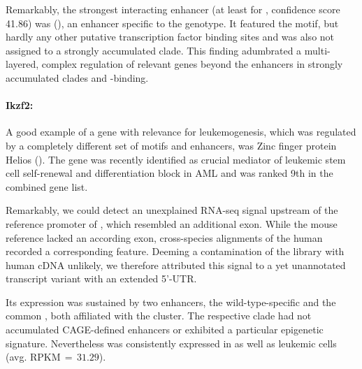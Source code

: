 Remarkably, the strongest interacting enhancer (at least for , confidence score \num{41.86}) was (), an enhancer specific to the  \dnmtchip genotype. It featured the \motifmlltwo motif, but hardly any other putative transcription factor binding sites and was also not assigned to a strongly accumulated clade. This finding adumbrated a multi-layered, complex regulation of relevant genes beyond the enhancers in strongly accumulated clades and -binding.   

\paragraph{Ikzf2:} A good example of a gene with relevance for leukemogenesis, which was regulated by a completely different set of motifs and enhancers, was Zinc finger protein Helios (). The gene was recently identified as crucial mediator of leukemic stem cell self-renewal and differentiation block in AML\cite{Park2019} and was ranked 9th in the combined gene list. 

Remarkably, we could detect an unexplained RNA-seq signal upstream of the reference promoter of , which resembled an additional exon.  While the mouse reference lacked an according exon, cross-species alignments of the human  recorded a corresponding feature. Deeming a contamination of the library with human cDNA unlikely, we therefore attributed this signal to a yet unannotated transcript variant with an extended 5'-UTR.   

Its expression was sustained by two enhancers,  the wild-type-specific  and the common , both affiliated with the \amitthree cluster. The respective clade  had not accumulated CAGE-defined enhancers or exhibited a particular epigenetic signature\dns. Nevertheless  was consistently expressed in \dnmtwt as well as \dnmtchip leukemic cells (avg. RPKM$\,=\,31.29$). 

